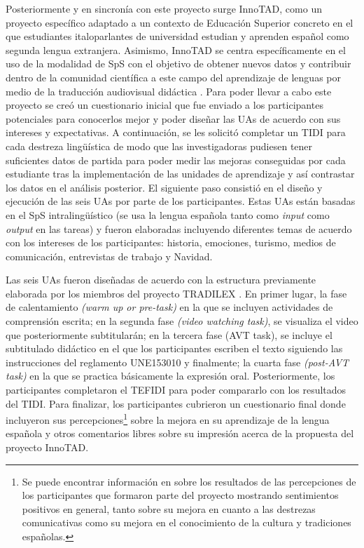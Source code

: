 \documentclass[spanish]{textolivre}
\begin{document}
Posteriormente y en sincronía con este proyecto surge InnoTAD, como un proyecto específico adaptado a un contexto de Educación Superior concreto en el que estudiantes italoparlantes de universidad estudian y aprenden español como segunda lengua extranjera. Asimismo, InnoTAD se centra específicamente en el uso de la modalidad de SpS con el objetivo de obtener nuevos datos y contribuir dentro de la comunidad científica a este campo del aprendizaje de lenguas por medio de la traducción audiovisual didáctica \cite{couto-cantero-trovato2023}. Para poder llevar a cabo este proyecto se creó un cuestionario inicial que fue enviado a los participantes potenciales para conocerlos mejor y poder diseñar las UAs de acuerdo con sus intereses y expectativas. A continuación, se les solicitó completar un TIDI para cada destreza lingüística de modo que las investigadoras pudiesen tener suficientes datos de partida para poder medir las mejoras conseguidas por cada estudiante tras la implementación de las unidades de aprendizaje y así contrastar los datos en el análisis posterior. El siguiente paso consistió en el diseño y ejecución de las seis UAs por parte de los participantes. Estas UAs están basadas en el SpS intralingüístico (se usa la lengua española tanto como \textit{input} como \textit{output} en las tareas) y fueron elaboradas incluyendo diferentes temas de acuerdo con los intereses de los participantes: historia, emociones, turismo, medios de comunicación, entrevistas de trabajo y Navidad.

Las seis UAs fueron diseñadas de acuerdo con la estructura previamente elaborada por los miembros del proyecto TRADILEX \cite{talavan2024}. En primer lugar, la fase de calentamiento \textit{(warm up or pre-task)} en la que se incluyen actividades de comprensión escrita; en la segunda fase \textit{(video watching task)}, se visualiza el video que posteriormente subtitularán; en la tercera fase (AVT task), se incluye el subtitulado didáctico en el que los participantes escriben el texto siguiendo las instrucciones del reglamento UNE153010 y finalmente; la cuarta fase \textit{(post-AVT task)} en la que se practica básicamente la expresión oral. Posteriormente, los participantes completaron el TEFIDI para poder compararlo con los resultados del TIDI. Para finalizar, los participantes cubrieron un cuestionario final donde incluyeron sus percepciones\footnote{Se puede encontrar información en \textcite{couto-cantero-trovato2023} sobre los resultados de las percepciones de los participantes que formaron parte del proyecto mostrando sentimientos positivos en general, tanto sobre su mejora en cuanto a las destrezas comunicativas como su mejora en el conocimiento de la cultura y tradiciones españolas.} sobre la mejora en su aprendizaje de la lengua española y otros comentarios libres sobre su impresión acerca de la propuesta del proyecto InnoTAD. 
\end{document}
